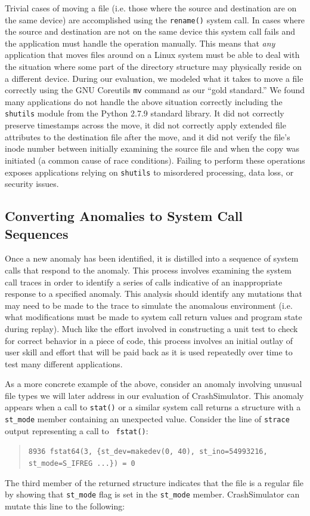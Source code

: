 Trivial cases of moving a file (i.e. those where the source and destination
are on the same device) are accomplished using the {\tt rename()} system
call.  In cases where the source and destination are not on the same device
this system call fails and the application must handle the operation
manually. This means that \emph{any} application that moves files around on
a Linux system must be able to deal with the situation where some part of
the directory structure may physically reside on a different device.
During our evaluation, we modeled what it takes to move a file correctly
using the GNU Coreutils {\tt mv} command as our ``gold standard.''  We
found many applications do not handle the above situation correctly
including the {\tt shutils} module from the Python 2.7.9 standard library.
It did not correctly preserve timestamps across the move, it did not
correctly apply extended file attributes to the destination file after the
move, and it did not verify the file's inode number between initially
examining the source file and when the copy was initiated (a common cause
of race conditions).  Failing to perform these operations exposes
applications relying on {\tt shutils} to misordered processing, data loss,
or security issues.

\subsection{Converting Anomalies to System Call Sequences}

Once a new anomaly has been identified, it is distilled into a sequence of
system calls that respond to the anomaly.  This process involves examining
the system call traces in order to identify a series of calls indicative of
an inappropriate response to a specified anomaly.  This analysis should
identify any mutations that may need to be made to the trace
to simulate the anomalous environment (i.e. what modifications must be made
to system call return values and program state during replay).  Much like
the effort involved in constructing a unit test to check for correct
behavior in a piece of code, this process involves an initial outlay of
user skill and effort that will be paid back as it is used repeatedly over
time to test many different applications.

As a more concrete example of the above, consider an anomaly
involving unusual file types we will later address in our evaluation of
CrashSimulator.  This anomaly appears when a call to {\tt stat()} or a similar system
call returns a structure with a {\tt st\_mode} member containing an unexpected
value. Consider the line of {\tt strace} output representing a call to {\tt
  fstat()}:
\begin{quote}
  {\tt 8936  fstat64(3, \{st\_dev=makedev(0, 40), st\_ino=54993216, st\_mode=S\_IFREG ...\}) = 0}
\end{quote}
The third member of the returned structure indicates that the file is a
regular file by showing that {\tt st\_mode} flag is set in the {\tt st\_mode}
member.  CrashSimulator can mutate this  line to the following:

